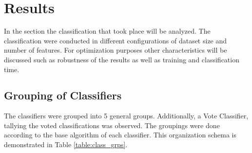 \section{Results}
	In the section the classification that took place will be analyzed. The classification were conducted in different configurations of  dataset size and number of features. For optimization purposes other characteristics will be discussed such as robustness of the results as well as training and classification time.
	
	\subsection{Grouping of Classifiers}
		The classifiers were grouped into 5 general groups. Additionally, a Vote Classifier, tallying the voted classifications was observed. The groupings were done according to the base algorithm of each classifier. This organization schema is demonstrated in Table \ref{table:class_grps}.
		
